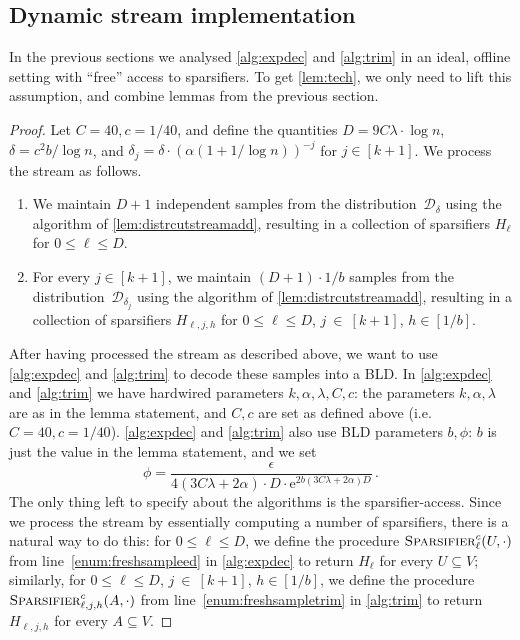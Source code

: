\documentclass[epsfig,letter,11pt]{article}
\numberwithin{equation}{section}
\newcommand{\e}{\mathrm{e}}
\begin{document}
\subsection{Dynamic stream implementation}
\label{subsec:dyn}
In the previous sections we analysed \cref{alg:expdec} and \cref{alg:trim} in an ideal, offline setting with ``free'' access to sparsifiers. To get \cref{lem:tech},  we only need to lift this assumption, and combine lemmas from the previous section.

\unified*

\begin{proof}
	Let $C=40, c=1/40$, and define the quantities $D=9C\lambda \cdot \log n$, $\delta=c^2b/\log n$, and $\delta_j=\delta \cdot (\alpha(1+1/\log n))^{-j}$ for $j \in [k+1]$. We process the stream as follows.
	\begin{enumerate}
		\item We maintain $D+1$ independent samples from the distribution~$\mathcal{D}_\delta$ using the algorithm of  \cref{lem:distrcutstreamadd}, resulting in a collection of sparsifiers $H_\ell$ for $0 \le \ell \le D$.
		\item For every $j \in [k+1]$, we maintain $(D+1) \cdot 1/b$ samples from the distribution~$\mathcal{D}_{\delta_j}$ using the algorithm of  \cref{lem:distrcutstreamadd}, resulting in a collection of sparsifiers $H_{\ell,j,h}$ for $0 \le \ell \le D$, $j~\in~[k+1]$, $h \in [1/b]$.
	\end{enumerate}
	
	\noindent
	After having processed the stream as described above, we want to use \cref{alg:expdec}  and \cref{alg:trim} to decode these samples into a BLD. In \cref{alg:expdec} and \cref{alg:trim} we have hardwired parameters $k,\alpha,\lambda,C,c$: the parameters $k,\alpha,\lambda$ are as in the lemma statement, and $C,c$ are set as defined above (i.e. $C=40, c=1/40$). \cref{alg:expdec} and \cref{alg:trim} also use BLD parameters $b,\phi$: $b$ is just the value in the lemma statement, and we set
	\begin{equation*}
		\phi = \frac{\epsilon}{4 (3C\lambda+2\alpha) \cdot D \cdot  \e^{2b (3C\lambda+2\alpha) D}} \, .
	\end{equation*}
	The only thing left to specify about the algorithms is the sparsifier-access. Since we process the stream by essentially computing a number of sparsifiers, there is a natural way to do this: for $0 \le \ell \le D$,  we define the procedure $\textsc{Sparsifier}^c_\ell(U,\cdot)$ from line~\eqref{enum:freshsampleed} in \cref{alg:expdec} to return $H_\ell$ for every $U \subseteq V$;  similarly, for $0 \le \ell \le D$, $j~\in~[k+1]$, $h \in [1/b]$, we define the procedure $\textsc{Sparsifier}^c_{\ell,j,h}(A,\cdot)$ from line~\eqref{enum:freshsampletrim} in \cref{alg:trim} to return $H_{\ell,j,h}$ for every $A \subseteq V$.
	

\end{proof}
\end{document}
